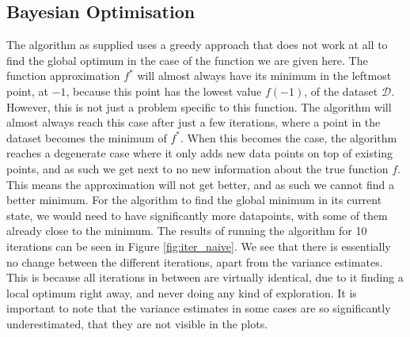 \subsection{Bayesian Optimisation}
The algorithm as supplied uses a greedy approach that does not work at all to find the global optimum in the case of the function we are given here. The function approximation $f^*$ will almost always have its minimum in the leftmost point, at $-1$, because this point has the lowest value $f(-1)$, of the dataset $\mathcal{D}$. However, this is not just a problem specific to this function. The algorithm will almost always reach this case after just a few iterations, where a point in the dataset becomes the minimum of $f^*$. When this becomes the case, the algorithm reaches a degenerate case where it only adds new data points on top of existing points, and as such we get next to no new information about the true function $f$. This means the approximation will not get better, and as such we cannot find a better minimum. For the algorithm to find the global minimum in its current state, we would need to have significantly more datapoints, with some of them already close to the minimum. The results of running the algorithm for 10 iterations can be seen in Figure \ref{fig:iter_naive}. We see that there is essentially no change between the different iterations, apart from the variance estimates. This is because all iterations in between are virtually identical, due to it finding a local optimum right away, and never doing any kind of exploration. It is important to note that the variance estimates in some cases are so significantly underestimated, that they are not visible in the plots.

